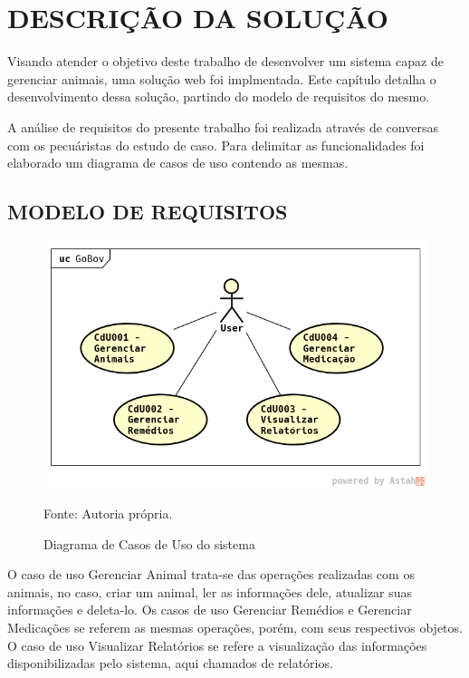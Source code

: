 %
%


\chapter{\textbf{DESCRIÇÃO DA SOLUÇÃO}}\label{chap:descSolucao}

Visando atender o objetivo deste trabalho de desenvolver um sistema capaz de gerenciar animais, uma solução web foi implmentada. Este capítulo detalha o desenvolvimento dessa solução, partindo do modelo de requisitos do mesmo.

A análise de requisitos do presente trabalho foi realizada através de conversas com os pecuáristas do estudo de caso. Para delimitar as funcionalidades foi elaborado um diagrama de casos de uso contendo as mesmas.

\section{MODELO DE REQUISITOS}

\begin{figure}[H]
	\begin{center}
		\caption{Diagrama de Casos de Uso do sistema}
		\includegraphics[width=\textwidth]{../img/casosdeuso.png}

		Fonte: Autoria própria.
	\end{center}
	\label{CdU}
\end{figure}

O caso de uso Gerenciar Animal trata-se das operações realizadas com os animais, no caso, criar um animal, ler as informações dele, atualizar suas informações e deleta-lo. Os casos de uso Gerenciar Remédios e Gerenciar Medicações se referem as mesmas operações, porém, com seus respectivos objetos. O caso de uso Visualizar Relatórios se refere a visualização das informações disponibilizadas pelo sistema, aqui chamados de relatórios.


